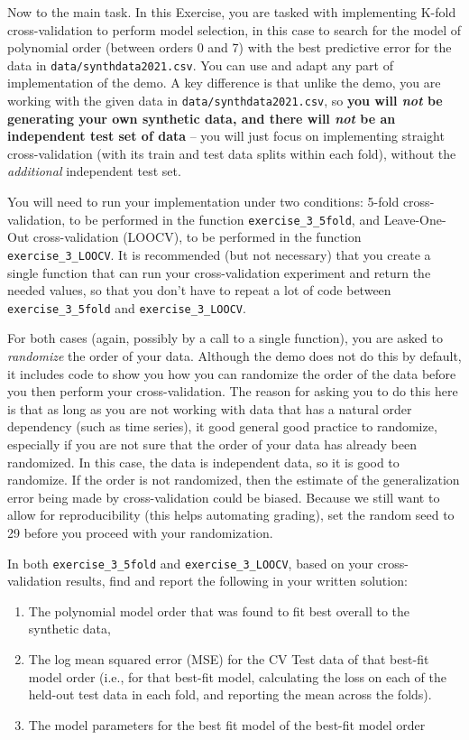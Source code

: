 \documentclass[10pt]{article}
\begin{document}
\begin{itemize}
Now to the main task. In this Exercise, you are tasked with implementing K-fold cross-validation to perform model selection, in this case to search for the model of polynomial order (between orders 0 and 7) with the best predictive error for the data in {\tt data/synthdata2021.csv}. You can use and adapt any part of implementation of the demo. A key difference is that unlike the demo, you are working with the given data in {\tt data/synthdata2021.csv}, so {\bf you will {\em not} be generating your own synthetic data, and there will {\em not} be an independent test set of data} -- you will just focus on implementing straight cross-validation (with its train and test data splits within each fold), without the {\em additional} independent test set.

You will need to run your implementation under two conditions: 5-fold cross-validation, to be performed in the function {\tt exercise\_3\_5fold}, and Leave-One-Out cross-validation (LOOCV), to be performed in the function {\tt exercise\_3\_LOOCV}. It is recommended (but not necessary) that you create a single function that can run your cross-validation experiment and return the needed values, so that you don't have to repeat a lot of code between {\tt exercise\_3\_5fold} and {\tt exercise\_3\_LOOCV}.

For both cases (again, possibly by a call to a single function), you are asked to {\em randomize} the order of your data. Although the demo does not do this by default, it includes code to show you how you can randomize the order of the data before you then perform your cross-validation. The reason for asking you to do this here is that as long as you are not working with data that has a natural order dependency (such as time series), it good general good practice to randomize, especially if you are not sure that the order of your data has already been randomized. In this case, the data is independent data, so it is good to randomize. If the order is not randomized, then the estimate of the generalization error being made by cross-validation could be biased. Because we still want to allow for reproducibility (this helps automating grading), set the random seed to 29 before you proceed with your randomization.

In both {\tt exercise\_3\_5fold} and {\tt exercise\_3\_LOOCV}, based on your cross-validation results, find and report the following in your written solution:
\begin{enumerate}
\item The polynomial model order that was found to fit best overall to the synthetic data,
\item The log mean squared error (MSE) for the CV Test data of that best-fit model order (i.e., for that best-fit model, calculating the loss on each of the held-out test data in each fold, and reporting the mean across the folds).
\item The model parameters for the best fit model of the best-fit model order
\end{enumerate}


\end{itemize}
\end{document}
